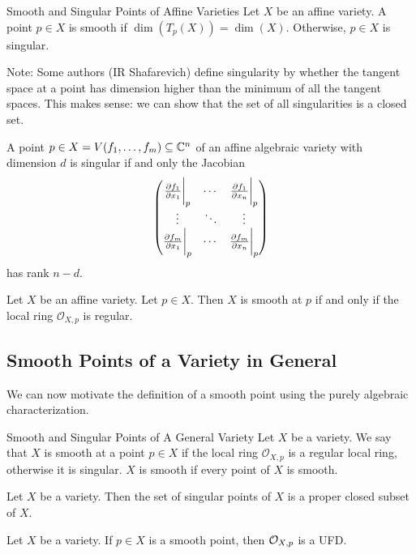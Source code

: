\documentclass[a4paper]{article}
\begin{document}
\begin{defn}{Smooth and Singular Points of Affine Varieties}{} Let $X$ be an affine variety. A point $p\in X$ is smooth if $\dim(T_p(X))=\dim(X)$. Otherwise, $p\in X$ is singular. 
\end{defn}

Note: Some authors (IR Shafarevich) define singularity by whether the tangent space at a point has dimension higher than the minimum of all the tangent spaces. This makes sense: we can show that the set of all singularities is a closed set. 

\begin{prp}{}{} A point $p\in X=V(f_1,\dots,f_m)\subseteq\mathbb{C}^n$ of an affine algebraic variety with dimension $d$ is singular if and only the Jacobian $$\begin{pmatrix}
\frac{\partial f_1}{\partial x_1}\bigg{|}_p & \cdots & \frac{\partial f_1}{\partial x_n}\bigg{|}_p\\
\vdots & \ddots & \vdots\\
\frac{\partial f_m}{\partial x_1}\bigg{|}_p & \cdots & \frac{\partial f_m}{\partial x_n}\bigg{|}_p
\end{pmatrix}$$
has rank $n-d$. 
\end{prp}

\begin{prp}{}{} Let $X$ be an affine variety. Let $p\in X$. Then $X$ is smooth at $p$ if and only if the local ring $\mathcal{O}_{X,p}$ is regular. 
\end{prp}

\subsection{Smooth Points of a Variety in General}
We can now motivate the definition of a smooth point using the purely algebraic characterization. 

\begin{defn}{Smooth and Singular Points of A General Variety}{} Let $X$ be a variety. We say that $X$ is smooth at a point $p\in X$ if the local ring $\mathcal{O}_{X,p}$ is a regular local ring, otherwise it is singular. $X$ is smooth if every point of $X$ is smooth. 
\end{defn}

\begin{thm}{}{} Let $X$ be a variety. Then the set of singular points of $X$ is a proper closed subset of $X$. 
\end{thm}

\begin{prp}{}{} Let $X$ be a variety. If $p\in X$ is a smooth point, then $\mathcal{O}_{X,p}$ is a UFD. 
\end{prp}
\end{document}
